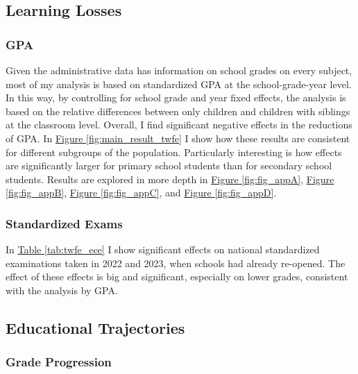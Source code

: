 \subsection{Learning Losses}


\subsubsection{GPA}

Given the administrative data has information on school grades on every subject, most of my analysis is based on standardized GPA at the school-grade-year level. In this way, by controlling for school grade and year fixed effects, the analysis is based on the relative differences between only children and children with siblings at the classroom level. Overall, I find significant negative effects in the reductions of GPA.  In \hyperref[fig:main_result_twfe]{Figure \ref{fig:main_result_twfe}} I show how these results are consistent for different subgroups of the population. Particularly interesting is how effects are significantly larger for primary school students than for secondary school students. Results are explored in more depth in \hyperref[fig:fig_appA]{Figure \ref{fig:fig_appA}}, \hyperref[fig:fig_appB]{Figure \ref{fig:fig_appB}}, \hyperref[fig:fig_appC]{Figure \ref{fig:fig_appC}}, and \hyperref[fig:fig_appD]{Figure \ref{fig:fig_appD}}.

\subsubsection{Standardized Exams}

In \hyperref[tab:twfe_ece]{Table \ref{tab:twfe_ece}}
I show significant effects on national standardized examinations taken in 2022 and 2023, when schools had already re-opened. The effect of these effects is big and significant, especially on lower grades, consistent with the analysis by GPA.

\subsection{Educational Trajectories}

\subsubsection{Grade Progression}


